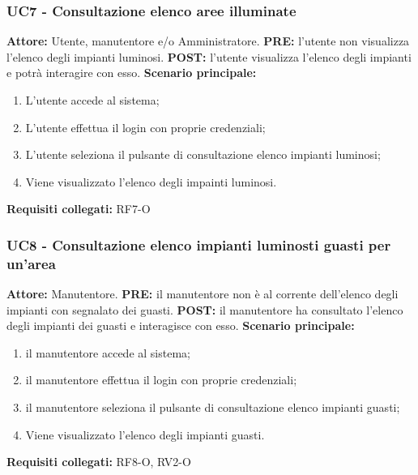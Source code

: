 \documentclass[a4paper, 12pt]{article}
\begin{document}
\subsubsection{UC7 - Consultazione elenco aree illuminate}
\textbf{Attore:} Utente, manutentore e/o Amministratore. \newline
\textbf{PRE:} l'utente non visualizza l'elenco degli impianti luminosi.\newline
\textbf{POST:} l'utente visualizza l'elenco degli impianti e potrà interagire con esso.\newline
\textbf{Scenario principale:}
\begin{enumerate}
    \item L'utente accede al sistema;
    \item L'utente effettua il login con proprie credenziali;
    \item L'utente seleziona il pulsante di consultazione elenco impianti luminosi;
    \item Viene visualizzato l'elenco degli impainti luminosi.
\end{enumerate}
\textbf{Requisiti collegati:} RF7-O\newline

\subsubsection{UC8 - Consultazione elenco impianti luminosti guasti per un'area}
\textbf{Attore:} Manutentore.\newline
\textbf{PRE:} il manutentore non è al corrente dell'elenco degli impianti con segnalato dei guasti.\newline
\textbf{POST:} il manutentore ha consultato l'elenco degli impianti dei guasti e interagisce con esso.\newline
\textbf{Scenario principale:}
\begin{enumerate}
    \item il manutentore accede al sistema;
    \item il manutentore effettua il login con proprie credenziali;
    \item il manutentore seleziona il pulsante di consultazione elenco impianti guasti;
    \item Viene visualizzato l'elenco degli impianti guasti.
\end{enumerate}
\textbf{Requisiti collegati:} RF8-O, RV2-O\newline
\end{document}
